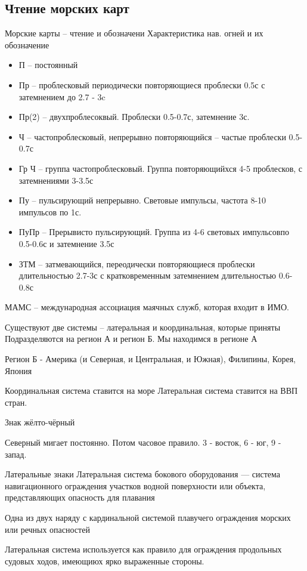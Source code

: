 \documentclass{article}        %
\begin{document}
\subsection{Чтение морских карт}
Морские карты -- чтение и обозначени
Характеристика нав. огней и их обозначение

\begin{itemize}
\item П -- постоянный
\item Пр -- проблесковый периодически повторяющиеся проблески 0.5с с затемнением до 2.7 - 3c
\item Пр(2) -- двухпроблесоквый. Проблески 0.5-0.7с, затемнение 3с.
\item Ч -- частопроблесковый, непрерывно повторяющийся -- частые проблески 0.5-0.7с
\item Гр Ч -- группа частопроблесковый. Группа повторяющийхся 4-5 проблесков, с затемнениями 3-3.5с
\item Пу -- пульсирующий непрерывно. Световые импульсы, частота 8-10 импульсов по 1с.
\item ПуПр -- Прерывисто пульсирующий. Группа из 4-6 световых импульсовпо 0.5-0.6с и затемнение 3.5с
\item ЗТМ -- затмевающийся, переодически повторяющиеся проблески длительностью 2.7-3с с кратковременным затемнением длительностью 0.6-0.8с

\end{itemize}
МАМС -- международная ассоциация маячных служб, которая входит в ИМО.

Существуют две системы -- латеральная и координальная, которые приняты
Подразделяются на регион А и регион Б. Мы находимся в регионе А

Регион Б - Америка (и Северная, и Центральная, и Южная), Филипины, Корея, Япония

Координальная система ставится на море
Латеральная система ставится на ВВП стран. 

Знак жёлто-чёрный

Северный мигает постоянно.
Потом часовое правило. 3 - восток, 6 - юг, 9 - запад.

Латеральные знаки
Латеральная система бокового оборудования --- система навигационного 
ограждения участков водной поверхности или объекта, представляющих опасность 
для плавания

Одна из двух наряду с кардинальной системой плавучего ограждения морских или речных опасностей

Латеральная система используется как правило для ограждения 
продольных судовых ходов, имеющиюх ярко выраженные стороны.
\end{document}
